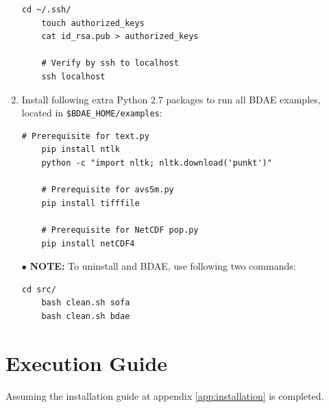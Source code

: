 \begin{enumerate}
	\begin{lstlisting}[numbers=none, backgroundcolor=\color{sourcebackground}, rulecolor=\color{sourcebackground}, framextopmargin=5pt, framexbottommargin=5pt, frame=tb, xrightmargin=15pt, commentstyle=\color{bashcommetcolor}]
	cd ~/.ssh/
	touch authorized_keys
	cat id_rsa.pub > authorized_keys
	
	# Verify by ssh to localhost
	ssh localhost
	\end{lstlisting}
	\vspace*{-6mm}
	\item Install following extra Python 2.7 packages to run all BDAE examples, located in \texttt{\$BDAE\_HOME/examples}:

	\begin{lstlisting}[numbers=none, backgroundcolor=\color{sourcebackground}, rulecolor=\color{sourcebackground}, framextopmargin=5pt, framexbottommargin=5pt, frame=tb, xrightmargin=15pt, commentstyle=\color{bashcommetcolor}, showstringspaces=false]
	# Prerequisite for text.py
	pip install ntlk
	python -c "import nltk; nltk.download('punkt')"
	
	# Prerequisite for avs5m.py
	pip install tifffile
		
	# Prerequisite for NetCDF pop.py
	pip install netCDF4
	\end{lstlisting}
	\vspace*{-6mm}
	\item[$\bullet$] {\sffamily\textbf{NOTE:}} To uninstall \CodeName and BDAE, use following two commands:
	\begin{lstlisting}[numbers=none, backgroundcolor=\color{sourcebackground}, rulecolor=\color{sourcebackground}, framextopmargin=5pt, framexbottommargin=5pt, frame=tb, xrightmargin=15pt, commentstyle=\color{bashcommetcolor}, showstringspaces=false]
	cd src/
	bash clean.sh sofa
	bash clean.sh bdae		
	\end{lstlisting}
\end{enumerate}


\chapter{Execution Guide} \label{app:execution}
Assuming the installation guide at appendix \ref{app:installation} is completed.

